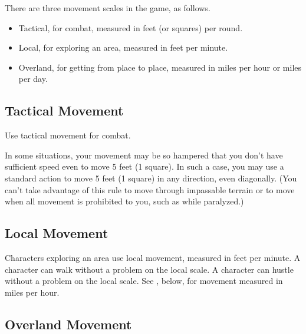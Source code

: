     There are three movement scales in the game, as follows.
    \begin{itemize}
        \item Tactical, for combat, measured in feet (or squares) per round.
        \item Local, for exploring an area, measured in feet per minute.
        \item Overland, for getting from place to place, measured in miles per
            hour or miles per day.
    \end{itemize}

    \subsection{Tactical Movement}
        Use tactical movement for combat.

         In some situations, your movement may be so hampered that you don't have sufficient speed even to move 5 feet (1 square). In such a case, you may use a standard action to move 5 feet (1 square) in any direction, even diagonally. (You can't take advantage of this rule to move through impassable terrain or to move when all movement is prohibited to you, such as while paralyzed.)

    \subsection{Local Movement}
        Characters exploring an area use local movement, measured in feet per minute.
         A character can walk without a problem on the local scale.
         A character can hustle without a problem on the local scale. See , below, for movement measured in miles per hour.

    \subsection{Overland Movement}\label{Overland Movement}

